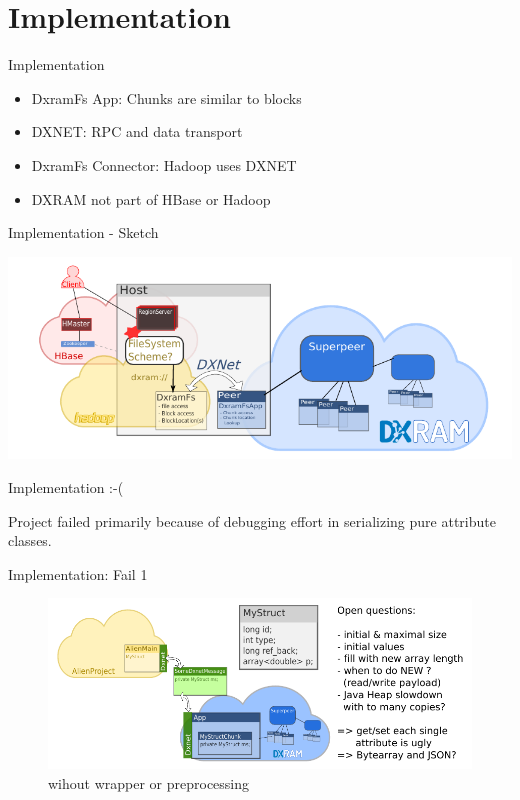 \hypertarget{implementation}{%
\section{Implementation}\label{implementation}}

\begin{frame}{Implementation}
\protect\hypertarget{implementation-1}{}

\begin{itemize}
\tightlist
\item
  DxramFs App: Chunks are similar to blocks
\item
  DXNET: RPC and data transport
\item
  DxramFs Connector: Hadoop uses DXNET
\item
  DXRAM not part of HBase or Hadoop
\end{itemize}

\end{frame}

\begin{frame}{Implementation - Sketch}
\protect\hypertarget{implementation---sketch}{}

\includegraphics{fig/done.pdf}

\end{frame}

\begin{frame}{Implementation :-(}
\protect\hypertarget{implementation--}{}

Project failed primarily because of debugging effort in serializing pure
attribute classes.

\end{frame}

\begin{frame}{Implementation: Fail 1}
\protect\hypertarget{implementation-fail-1}{}

\begin{figure}
\centering
\includegraphics{fig/structUgly.pdf}
\caption{wihout wrapper or preprocessing}
\end{figure}

\end{frame}

